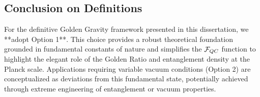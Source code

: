 \subsection*{Conclusion on Definitions}
For the definitive Golden Gravity framework presented in this dissertation, we **adopt Option 1**. This choice provides a robust theoretical foundation grounded in fundamental constants of nature and simplifies the $\mathcal{F}_{QC}$ function to highlight the elegant role of the Golden Ratio and entanglement density at the Planck scale. Applications requiring variable vacuum conditions (Option 2) are conceptualized as deviations from this fundamental state, potentially achieved through extreme engineering of entanglement or vacuum properties.


